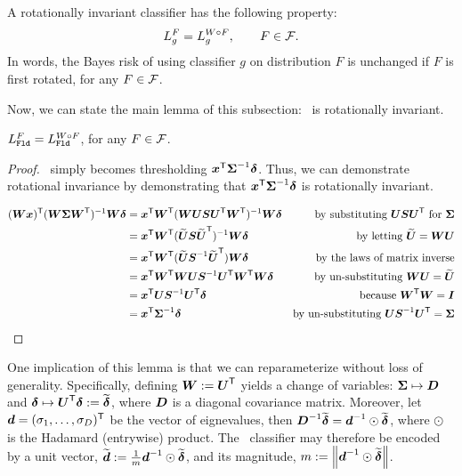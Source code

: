 \documentclass[10pt]{article}
\begin{document}
\begin{defi}
A rotationally invariant classifier has the following property:
$$L_g^F = L_g^{W \circ F}, \qquad F \in \mathcal{F}.$$
In words, the Bayes risk of using classifier $g$ on distribution $F$ is unchanged if $F$ is first rotated, for any $F \in \mathcal{F}$.
\end{defi}


Now, we can state the main lemma of this subsection:  \Fld~is rotationally invariant.
\begin{lem} \label{lem:rot}
$L_{{\sc \texttt{Fld}}}^F = L_{{\sc \texttt{Fld}}}^{W \circ F}$, for any $F \in \mathcal{F}$.
\end{lem}

\begin{proof}
\Fld~simply becomes thresholding $\boldsymbol{x}^{\mathsf{T}} \boldsymbol{\Sigma}^{-1} \boldsymbol{\delta}$.  Thus, we can demonstrate rotational invariance by demonstrating that $\boldsymbol{x}^{\mathsf{T}} \boldsymbol{\Sigma}^{-1} \boldsymbol{\delta}$ is rotationally invariant. 


\begin{align*}
(\bW \bx) \T  (\bW \bSig \bW\T )^{-1} \bW \bdel  %
&= \bx\T \bW\T  (\bW \bU \bS \bU\T \bW\T)^{-1} \bW \bdel & \text{by substituting $\bU \bS \bU\T$ for $\bSig$} \\
&= \bx\T \bW\T  (\mt{\bU} \bS \mt{\bU}\T)^{-1} \bW \bdel & \text{by letting $\mt{\bU}=\bW \bU$} \\
&= \bx\T \bW\T  (\mt{\bU} \bS^{-1} \mt{\bU}\T) \bW \bdel & \text{by the laws of matrix inverse} \\
&= \bx\T \bW\T  \bW \bU \bS^{-1}  \bU\T \bW\T \bW \bdel & \text{by un-substituting $\bW \bU=\mt{\bU}$} \\
&= \bx\T  \bU \bS^{-1}  \bU\T  \bdel  & \text{because $\bW\T \bW = \bI$} \\
&= \bx\T   \bSig^{-1} \bdel & \text{by un-substituting $\bU \bS^{-1} \bU\T = \bSig$}
\end{align*}
\end{proof}

One implication of this lemma is that we can reparameterize without loss of generality.  Specifically, defining $\boldsymbol{W} := \boldsymbol{U}^{\mathsf{T}}$ yields a change of variables: $\boldsymbol{\Sigma} \mapsto \boldsymbol{D}$ and $\boldsymbol{\delta} \mapsto \boldsymbol{U}^{\mathsf{T}} \boldsymbol{\delta} := \widetilde{\boldsymbol{\delta}}$, where $\boldsymbol{D}$ is a diagonal covariance matrix.  Moreover, let $\boldsymbol{d}=(\sigma_1,\ldots, \sigma_D)^{\mathsf{T}}$ be the vector of eignevalues, then $\boldsymbol{D}^{-1} \widetilde{\boldsymbol{\delta}}=\boldsymbol{d}^{-1} \odot \widetilde{\boldsymbol{\delta}}$, where $\odot$ is the Hadamard (entrywise) product.  The \Fld~classifier may therefore be encoded by a unit vector, $\widetilde{\boldsymbol{d}}:= \frac{1}{m} \boldsymbol{d}^{-1} \odot \widetilde{\boldsymbol{\delta}}$, and its magnitude, $m:=\left \lVert\boldsymbol{d}^{-1} \odot \widetilde{\boldsymbol{\delta}} \right \rVert$.
\end{document}
